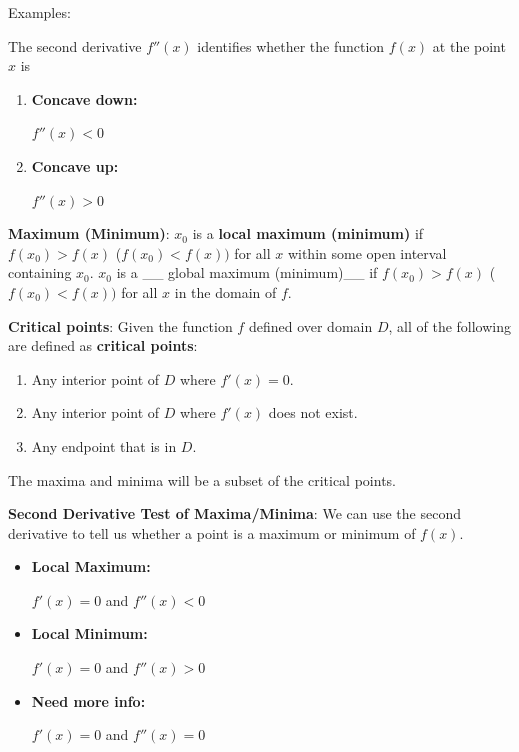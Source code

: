 \documentclass[]{book}
\providecommand{\tightlist}{%
  \setlength{\itemsep}{0pt}\setlength{\parskip}{0pt}}
\theoremstyle{definition}
\theoremstyle{definition}
\theoremstyle{definition}
\theoremstyle{remark}
\begin{document}
Examples:

The second derivative \(f''(x)\) identifies whether the function
\(f(x)\) at the point \(x\) is

\begin{enumerate}
        \item \parbox[t]{2in}{\bf Concave down:} $f''(x)<0$
        \item \parbox[t]{2in}{\bf Concave up:} $f''(x)>0$
\end{enumerate}

\textbf{Maximum (Minimum)}: \(x_0\) is a \textbf{local maximum
(minimum)} if \(f(x_0)>f(x)\) (\(f(x_0)<f(x))\) for all \(x\) within
some open interval containing \(x_0\). \(x_0\) is a \_\_ global maximum
(minimum)\_\_ if \(f(x_0)>f(x)\) (\(f(x_0)<f(x))\) for all \(x\) in the
domain of \(f\).

\textbf{Critical points}: Given the function \(f\) defined over domain
\(D\), all of the following are defined as \textbf{critical points}:

\begin{enumerate}
\def\labelenumi{\arabic{enumi}.}
\tightlist
\item
  Any interior point of \(D\) where \(f'(x)=0\).
\item
  Any interior point of \(D\) where \(f'(x)\) does not exist.
\item
  Any endpoint that is in \(D\).
\end{enumerate}

The maxima and minima will be a subset of the critical points.

\textbf{Second Derivative Test of Maxima/Minima}: We can use the second
derivative to tell us whether a point is a maximum or minimum of
\(f(x)\).

\begin{itemize}
    \item[] \parbox[t]{2in}{\bf Local Maximum:} $f'(x)=0$ and $f''(x)<0$
    \item[] \parbox[t]{2in}{\bf Local Minimum:} $f'(x)=0$ and $f''(x)>0$
    \item[] \parbox[t]{2in}{\bf Need more info:} $f'(x)=0$ and $f''(x)=0$
\end{itemize}
\end{document}
